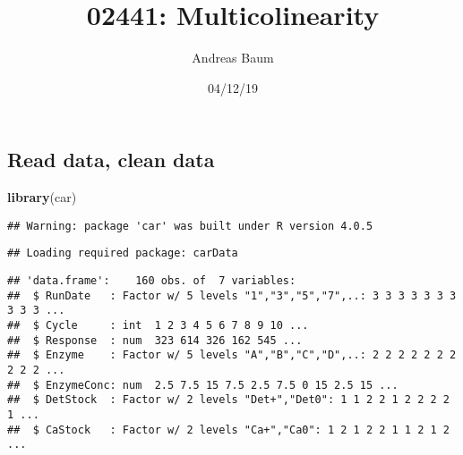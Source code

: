 \documentclass[
]{article}
\title{02441: Multicolinearity}
\author{Andreas Baum}
\date{04/12/19}
\newenvironment{Shaded}{\begin{snugshade}}{\end{snugshade}}
\newcommand{\CommentTok}[1]{\textcolor[rgb]{0.56,0.35,0.01}{\textit{#1}}}
\newcommand{\DataTypeTok}[1]{\textcolor[rgb]{0.13,0.29,0.53}{#1}}
\newcommand{\DecValTok}[1]{\textcolor[rgb]{0.00,0.00,0.81}{#1}}
\newcommand{\KeywordTok}[1]{\textcolor[rgb]{0.13,0.29,0.53}{\textbf{#1}}}
\newcommand{\NormalTok}[1]{#1}
\newcommand{\OperatorTok}[1]{\textcolor[rgb]{0.81,0.36,0.00}{\textbf{#1}}}
\newcommand{\OtherTok}[1]{\textcolor[rgb]{0.56,0.35,0.01}{#1}}
\newcommand{\StringTok}[1]{\textcolor[rgb]{0.31,0.60,0.02}{#1}}
\begin{document}
\maketitle

\hypertarget{read-data-clean-data}{%
\subsection{Read data, clean data}\label{read-data-clean-data}}

\begin{Shaded}
\begin{Highlighting}[]
\KeywordTok{library}\NormalTok{(car)}
\end{Highlighting}
\end{Shaded}

\begin{verbatim}
## Warning: package 'car' was built under R version 4.0.5
\end{verbatim}

\begin{verbatim}
## Loading required package: carData
\end{verbatim}

\begin{Shaded}
\end{Shaded}

\begin{verbatim}
## 'data.frame':    160 obs. of  7 variables:
##  $ RunDate   : Factor w/ 5 levels "1","3","5","7",..: 3 3 3 3 3 3 3 3 3 3 ...
##  $ Cycle     : int  1 2 3 4 5 6 7 8 9 10 ...
##  $ Response  : num  323 614 326 162 545 ...
##  $ Enzyme    : Factor w/ 5 levels "A","B","C","D",..: 2 2 2 2 2 2 2 2 2 2 ...
##  $ EnzymeConc: num  2.5 7.5 15 7.5 2.5 7.5 0 15 2.5 15 ...
##  $ DetStock  : Factor w/ 2 levels "Det+","Det0": 1 1 2 2 1 2 2 2 2 1 ...
##  $ CaStock   : Factor w/ 2 levels "Ca+","Ca0": 1 2 1 2 2 1 1 2 1 2 ...
\end{verbatim}
\end{document}
